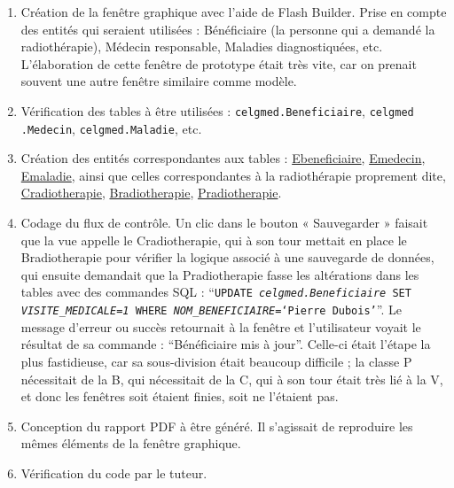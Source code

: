 \begin{enumerate}
\item Création de la fenêtre graphique avec l'aide de Flash Builder. Prise en compte des entités qui seraient utilisées : Bénéficiaire (la personne qui a demandé la radiothérapie), Médecin responsable, Maladies diagnostiquées, etc. L'élaboration de cette fenêtre de prototype était très vite, car on prenait souvent une autre fenêtre similaire comme modèle.
\item Vérification des tables à être utilisées : \texttt{celgmed.Beneficiaire}, \texttt{celgmed} \texttt{.Medecin}, \texttt{celgmed.Maladie}, etc.
\item Création des entités correspondantes aux tables : \underline{Ebeneficiaire}, \underline{Emedecin}, \underline{Emaladie}, ainsi que celles correspondantes à la radiothérapie proprement dite, \underline{Cradiotherapie}, \underline{Bradiotherapie}, \underline{Pradiotherapie}. 
\item Codage du flux de contrôle. Un clic dans le bouton « Sauvegarder » faisait que la vue appelle le Cradiotherapie, qui à son tour mettait en place le Bradiotherapie pour vérifier la logique associé à une sauvegarde de données, qui ensuite demandait que la Pradiotherapie fasse les altérations dans les tables avec des commandes SQL : ``\texttt{UPDATE \textit{celgmed.Beneficiaire} SET \textit{VISITE\_MEDICALE}=\textit{1} WHERE \textit{NOM\_BENEFICIAIRE}=`\textit{Pierre \\ Dubois}'}''. Le message d'erreur ou succès retournait à la fenêtre et l'utilisateur voyait le résultat de sa commande : ``Bénéficiaire mis à jour''. Celle-ci était l'étape la plus fastidieuse, car sa sous-division était beaucoup difficile ; la classe P nécessitait de la B, qui nécessitait de la C, qui à son tour était très lié à la V, et donc les fenêtres soit étaient finies, soit ne l'étaient pas.
\item Conception du rapport PDF à être généré. Il s'agissait de reproduire les mêmes éléments de la fenêtre graphique.
\item Vérification du code par le tuteur.
\end{enumerate}

